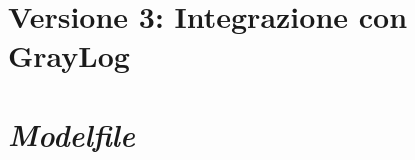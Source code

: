 \documentclass[12pt]{report}
\begin{document}


\clearpage

\section{Versione 3: Integrazione con GrayLog}



\clearpage

\section{\textit{Modelfile}}
\label{sec:code_modelfile}




%
%

\beforebibliography




\end{document}
